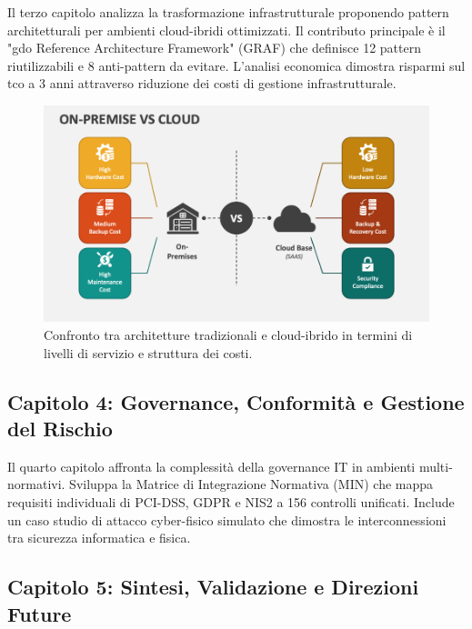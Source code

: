 Il terzo capitolo analizza la trasformazione infrastrutturale proponendo pattern architetturali per ambienti cloud-ibridi ottimizzati. Il contributo principale è il "\gls{gdo} Reference Architecture Framework" (GRAF) che definisce 12 pattern riutilizzabili e 8 anti-pattern da evitare. L'analisi economica dimostra risparmi sul \gls{tco} a 3 anni attraverso riduzione dei costi di gestione infrastrutturale.

\begin{figure}[H]
\centering
\includegraphics[width=\textwidth]{thesis_figures/cap1/on-premise-vs-cloud.png}
\caption{Confronto tra architetture tradizionali e cloud-ibrido in termini di livelli di servizio e struttura dei costi.}
\label{fig:on-premise-vs-cloud}
\end{figure}

\subsection{\texorpdfstring{\textbf{Capitolo 4: Governance, Conformità e Gestione del Rischio}}{1.6.3 - Capitolo 4: Governance, Conformità e Gestione del Rischio}}
\label{subsec:struttura_cap4}

Il quarto capitolo affronta la complessità della governance IT in ambienti multi-normativi. Sviluppa la Matrice di Integrazione Normativa (MIN) che mappa requisiti individuali di PCI-DSS, GDPR e NIS2 a 156 controlli unificati. Include un caso studio di attacco cyber-fisico simulato che dimostra le interconnessioni tra sicurezza informatica e fisica.

\subsection{\texorpdfstring{\textbf{Capitolo 5: Sintesi, Validazione e Direzioni Future}}{1.6.4 - Capitolo 5: Sintesi, Validazione e Direzioni Future}}
\label{subsec:struttura_cap5}


